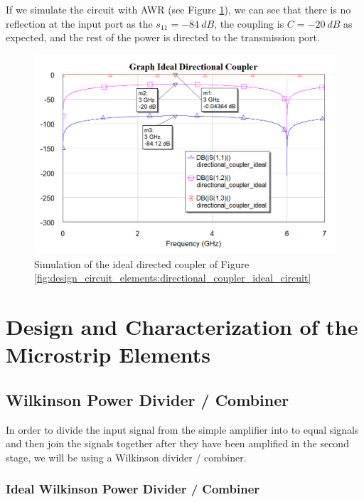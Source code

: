 \documentclass[12pt]{report} %
\let\oldsection\section
\renewcommand\section{\clearpage\oldsection}
\begin{document}
If we simulate the circuit with AWR (see Figure \ref{fig:design_circuit_elements:directional_coupler_ideal_graph}), we can see that there is no reflection at the input port as the $s_{11} = -84 \ dB$, the coupling is $C = -20 \ dB$ as expected, and the rest of the power is directed to the transmission port.

\begin{figure}[htbp]
    \centering
    \includegraphics[width=\linewidth]{images//design_circuit_elements/directional_coupler_ideal_graph.png}
    \caption{Simulation of the ideal directed coupler of Figure \ref{fig:design_circuit_elements:directional_coupler_ideal_circuit}}
    \label{fig:design_circuit_elements:directional_coupler_ideal_graph}
\end{figure}

\chapter{Design and Characterization of the Microstrip Elements}

\section{Wilkinson Power Divider / Combiner}

In order to divide the input signal from the simple amplifier into to equal signals and then join the signals together after they have been amplified in the second stage, we will be using a Wilkinson divider / combiner.

\subsection{Ideal Wilkinson Power Divider / Combiner}
\end{document}

